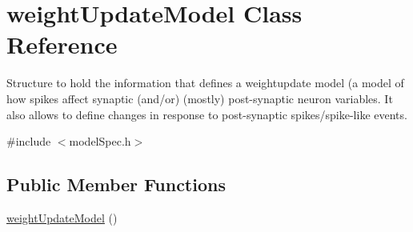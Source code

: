 \hypertarget{classweightUpdateModel}{\section{weight\+Update\+Model Class Reference}
\label{classweightUpdateModel}
}


Structure to hold the information that defines a weightupdate model (a model of how spikes affect synaptic (and/or) (mostly) post-\/synaptic neuron variables. It also allows to define changes in response to post-\/synaptic spikes/spike-\/like events.  




{\ttfamily \#include $<$model\+Spec.\+h$>$}

\subsection*{Public Member Functions}
\begin{DoxyCompactItemize}
\item 
\hyperlink{classweightUpdateModel_ae83d9e39690aaa754ab5be7b72ca60d5}{weight\+Update\+Model} ()
\end{DoxyCompactItemize}
